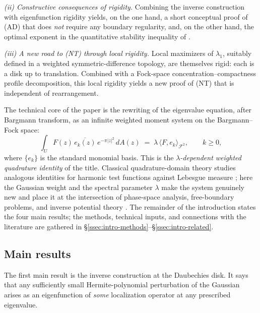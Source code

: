 \documentclass[a4paper,11pt,reqno]{amsart}
\numberwithin{equation}{section}
\theoremstyle{plain} %
\theoremstyle{definition} %
\theoremstyle{remark}
\begin{document}
\smallskip
\noindent\emph{(ii) Constructive consequences of rigidity.} Combining the inverse construction with eigenfunction rigidity yields, on the one hand, a short conceptual proof of (AD) that does \emph{not} require any boundary regularity, and, on the other hand, the optimal exponent in the quantitative stability inequality of \cite{Gomez-Guerra-Ramos-Tilli}.

\smallskip
\noindent\emph{(iii) A new road to (NT) through local rigidity.} Local maximizers of $\lambda_1$, suitably defined in a weighted symmetric-difference topology, are themselves rigid: each is a disk up to translation. Combined with a Fock-space concentration--compactness profile decomposition, this local rigidity yields a new proof of (NT) that is independent of rearrangement.

\medskip

The technical core of the paper is the rewriting of the eigenvalue equation, after Bargmann transform, as an infinite weighted moment system on the Bargmann--Fock space:
\begin{equation}\label{eq:moment-intro}
\int_U F(z)\,\overline{e_k(z)}\,e^{-\pi|z|^2}\,dA(z)
\;=\;
\lambda\,\langle F,e_k\rangle_{\mathcal F^2},
\qquad k\ge 0,
\end{equation}
where $\{e_k\}$ is the standard monomial basis. This is the \emph{$\lambda$-dependent weighted quadrature identity} of the title. Classical quadrature-domain theory studies analogous identities for harmonic test functions against Lebesgue measure \cite{Gustafsson,Gustafsson-Shahgholian,Shahgholian,Aharonov-Schiffer-Zalcman,Karp,Cherednichenko}; here the Gaussian weight and the spectral parameter $\lambda$ make the system genuinely new and place it at the intersection of phase-space analysis, free-boundary problems, and inverse potential theory \cite{Isakov}. The remainder of the introduction states the four main results; the methods, technical inputs, and connections with the literature are gathered in \S\ref{ssec:intro-methods}--\S\ref{ssec:intro-related}.

\subsection{Main results}\label{ssec:intro-main-results}

The first main result is the inverse construction at the Daubechies disk. It says that any sufficiently small Hermite-polynomial perturbation of the Gaussian arises as an eigenfunction of \emph{some} localization operator at any prescribed eigenvalue.
\end{document}
